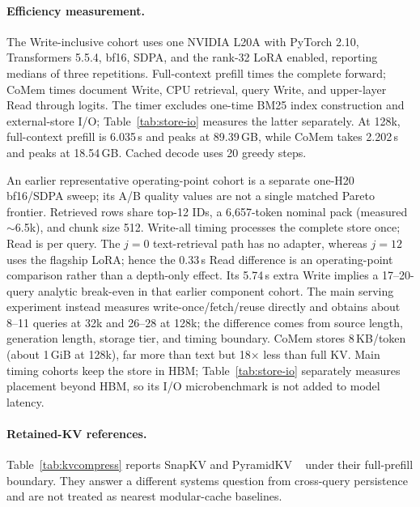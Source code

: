 \paragraph{Efficiency measurement.}
\label{app:efficiency}
The Write-inclusive cohort uses one NVIDIA L20A with PyTorch 2.10,
Transformers 5.5.4, bf16, SDPA, and the rank-32 LoRA enabled, reporting medians
of three repetitions. Full-context prefill times the complete forward; CoMem
times document Write, CPU retrieval, query Write, and upper-layer Read through
logits. The timer excludes one-time BM25 index construction and external-store
I/O; Table~\ref{tab:store-io} measures the latter separately. At 128k,
full-context prefill is 6.035\,s and peaks at 89.39\,GB, while CoMem takes
2.202\,s and peaks at 18.54\,GB. Cached decode uses 20 greedy steps.

An earlier representative operating-point cohort is a separate one-H20
bf16/SDPA sweep; its A/B quality values are not a single matched Pareto
frontier. Retrieved rows share top-12 IDs, a 6,657-token nominal pack
(measured $\sim$6.5k), and chunk size 512. Write-all timing processes the
complete store once; Read is per query. The $j{=}0$ text-retrieval path has no
adapter, whereas $j{=}12$ uses the flagship LoRA; hence the 0.33\,s Read
difference is an operating-point comparison rather than a depth-only effect.
Its 5.74\,s extra Write implies a 17--20-query analytic break-even in that
earlier component cohort.
The main serving experiment instead measures write-once/fetch/reuse directly
and obtains about 8--11 queries at 32k and 26--28 at 128k; the difference comes
from source length, generation length, storage tier, and timing boundary.
CoMem stores 8\,KB/token (about
1\,GiB at 128k), far more than text but 18$\times$ less than full KV. Main timing
cohorts keep the store in HBM; Table~\ref{tab:store-io} separately measures
placement beyond HBM, so its I/O microbenchmark is not added to model latency.

\paragraph{Retained-KV references.}
Table~\ref{tab:kvcompress} reports SnapKV and PyramidKV
~\citep{snapkv,pyramidkv} under their full-prefill boundary. They answer a
different systems question from cross-query persistence and are not treated as
nearest modular-cache baselines.



